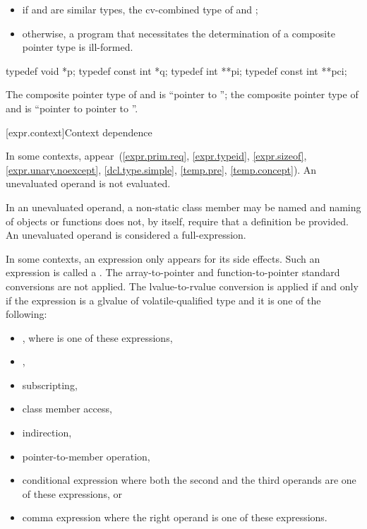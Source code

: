 \begin{itemize}
\item
if  and  are similar types, the cv-combined type of  and
;

\item
otherwise, a program that necessitates the determination of a
composite pointer type is ill-formed.
\end{itemize}

\begin{example}
\begin{codeblock}
typedef void *p;
typedef const int *q;
typedef int **pi;
typedef const int **pci;
\end{codeblock}

The composite pointer type of  and  is ``pointer to ''; the
composite pointer type of  and  is ``pointer to  pointer to
''.
\end{example}

[expr.context]{Context dependence}

\pnum
In some contexts, 
appear~(\ref{expr.prim.req},
\ref{expr.typeid},
\ref{expr.sizeof},
\ref{expr.unary.noexcept},
\ref{dcl.type.simple},
\ref{temp.pre},
\ref{temp.concept}).
An unevaluated operand is not evaluated.
\begin{note}
In an unevaluated operand, a non-static class member may be
named and naming of objects or functions does not, by
itself, require that a definition be provided.
An unevaluated operand is considered a full-expression.
\end{note}

\pnum
In some contexts, an expression only appears for its side effects. Such an
expression is called a .
The array-to-pointer
and function-to-pointer standard conversions are not
applied. The lvalue-to-rvalue conversion is applied
if and only if
the expression is a glvalue of volatile-qualified type and it is one of the
following:

\begin{itemize}
\item \tcode{(}  \tcode{)}, where
   is one of these expressions,
\item {},
\item subscripting,
\item class member access,
\item indirection,
\item pointer-to-member operation,
\item conditional expression where both the second and the
      third operands are one of these expressions, or
\item comma expression where the right operand is one of
      these expressions.
\end{itemize}

